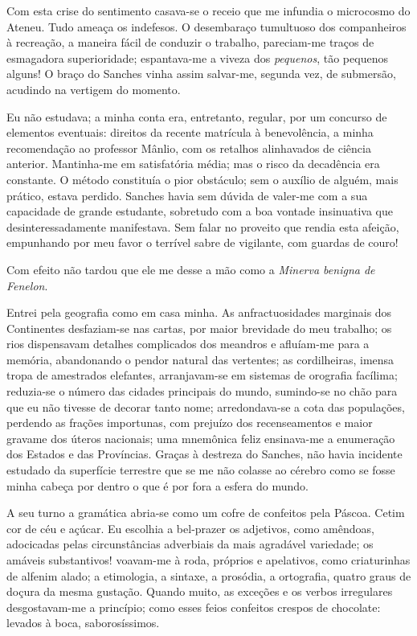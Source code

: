Com esta crise do sentimento casava{}-se o receio que me infundia o
microcosmo do Ateneu. Tudo ameaça os indefesos. O desembaraço
tumultuoso dos companheiros à recreação, a maneira fácil de conduzir o
trabalho, pareciam{}-me traços de esmagadora superioridade;
espantava{}-me a viveza dos \textit{pequenos}, tão pequenos alguns! O braço do
Sanches vinha assim salvar{}-me, segunda vez, de submersão, acudindo na
vertigem do momento. 

Eu não estudava; a minha conta era, entretanto,
regular, por um concurso de elementos eventuais: direitos da recente
matrícula à benevolência, a minha recomendação ao professor Mânlio, com
os retalhos alinhavados de ciência anterior. Mantinha{}-me em
satisfatória média; mas o risco da decadência era constante. O método
constituía o pior obstáculo; sem o auxílio de alguém, mais prático,
estava perdido. Sanches havia sem dúvida de valer{}-me com a sua
capacidade de grande estudante, sobretudo com a boa vontade insinuativa
que desinteressadamente manifestava. Sem falar no proveito que rendia
esta afeição, empunhando por meu favor o terrível sabre de vigilante,
com guardas de couro! 

Com efeito não tardou que ele me desse a mão como
a \textit{Minerva benigna de Fenelon}. 

Entrei pela geografia como em casa minha.
As anfractuosidades marginais dos Continentes desfaziam{}-se nas
cartas, por maior brevidade do meu trabalho; os rios dispensavam
detalhes complicados dos meandros e afluíam{}-me para a memória,
abandonando o pendor natural das vertentes; as cordilheiras, imensa
tropa de amestrados elefantes, arranjavam{}-se em sistemas de orografia
facílima; reduzia{}-se o número das cidades principais do mundo,
sumindo{}-se no chão para que eu não tivesse de decorar tanto nome;
arredondava{}-se a cota das populações, perdendo as frações importunas,
com prejuízo dos recenseamentos e maior gravame dos úteros nacionais;
uma mnemônica feliz ensinava{}-me a enumeração dos Estados e das
Províncias. Graças à destreza do Sanches, não havia incidente estudado
da superfície terrestre que se me não colasse ao cérebro como se fosse
minha cabeça por dentro o que é por fora a esfera do mundo. 

A seu turno a gramática abria{}-se como um cofre de confeitos pela Páscoa. 
Cetim cor de céu e açúcar. Eu escolhia a bel{}-prazer os adjetivos, como
amêndoas, adocicadas pelas circunstâncias adverbiais da mais agradável
variedade; os amáveis substantivos! voavam{}-me à roda, próprios e
apelativos, como criaturinhas de alfenim alado; a etimologia, a
sintaxe, a prosódia, a ortografia, quatro graus de doçura da mesma
gustação. Quando muito, as exceções e os verbos irregulares
desgostavam{}-me a princípio; como esses feios confeitos crespos de
chocolate: levados à boca, saborosíssimos. 

